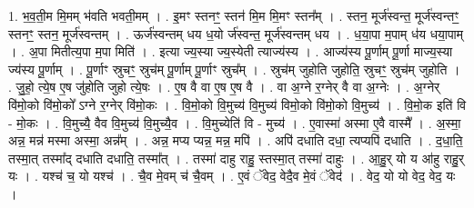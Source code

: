 \documentclass[17pt]{extarticle}
\begin{document}
1. भ॒व॒ती॒म मि॒मम् भ॑वति भवती॒मम् । . इ॒मꣳ स्तनꣳ॒॒ स्तन॑ मि॒म मि॒मꣳ स्तन᳚म् । . स्तन॒ मूर्ज॑स्वन्त॒ मूर्ज॑स्वन्तꣳ॒॒ स्तनꣳ॒॒ स्तन॒ मूर्ज॑स्वन्तम् । . ऊर्ज॑स्वन्तम् धय ध॒यो र्ज॑स्वन्त॒ मूर्ज॑स्वन्तम् धय । . ध॒या॒पा म॒पाम् ध॑य धया॒पाम् । . अ॒पा मितीत्य॒पा म॒पा मिति॑ । . इत्या ज्य॒स्या ज्य॒स्येती त्याज्य॑स्य । . आज्य॑स्य पू॒र्णाम् पू॒र्णा माज्य॒स्या ज्य॑स्य पू॒र्णाम् । . पू॒र्णाꣳ स्रुचꣳ॒॒ स्रुच॑म् पू॒र्णाम् पू॒र्णाꣳ स्रुच᳚म् । . स्रुच॑म् जुहोति जुहोति॒ स्रुचꣳ॒॒ स्रुच॑म् जुहोति । . जु॒हो॒ त्ये॒ष ए॒ष जु॑होति जुहो त्ये॒षः । . ए॒ष वै वा ए॒ष ए॒ष वै । . वा अ॒ग्ने र॒ग्नेर् वै वा अ॒ग्नेः । . अ॒ग्नेर् वि॑मो॒को वि॑मो॒को᳚ ऽग्ने र॒ग्नेर् वि॑मो॒कः । . वि॒मो॒को वि॒मुच्य॑ वि॒मुच्य॑ विमो॒को वि॑मो॒को वि॒मुच्य॑ । . वि॒मो॒क इति॑ वि - मो॒कः । . वि॒मुच्यै॒ वैव वि॒मुच्य॑ वि॒मुच्यै॒व । . वि॒मुच्येति॑ वि - मुच्य॑ । . ए॒वास्मा॑ अस्मा ए॒वै वास्मै᳚ । . अ॒स्मा॒ अन्न॒ मन्न॑ मस्मा अस्मा॒ अन्न᳚म् । . अन्न॒ मप्य प्यन्न॒ मन्न॒ मपि॑ । . अपि॑ दधाति दधा॒ त्यप्यपि॑ दधाति । . द॒धा॒ति॒ तस्मा॒त् तस्मा᳚द् दधाति दधाति॒ तस्मा᳚त् । . तस्मा॑ दाहु राहु॒ स्तस्मा॒त् तस्मा॑ दाहुः । . आ॒हु॒र् यो य आ॑हु राहु॒र् यः । . यश्च॑ च॒ यो यश्च॑ । . चै॒व मे॒वम् च॑ चै॒वम् । . ए॒वं ॅवेद॒ वेदै॒व मे॒वं ॅवेद॑ । . वेद॒ यो यो वेद॒ वेद॒ यः । \newline
\end{document}
